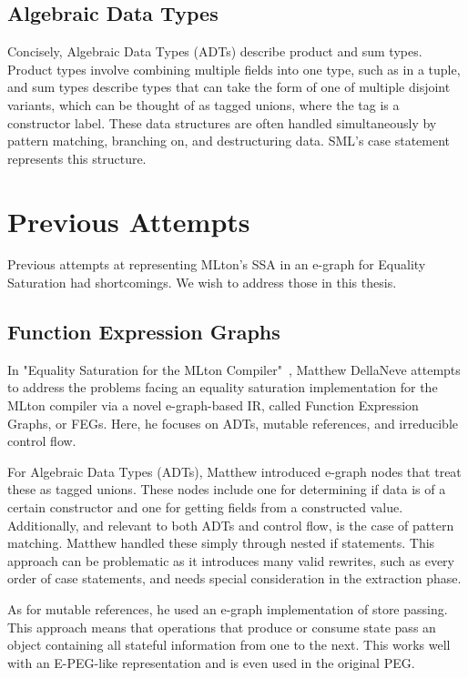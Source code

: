 \documentclass{article}
\begin{document}
\subsection{Algebraic Data Types}

Concisely, Algebraic Data Types (ADTs) describe product and sum types. Product types involve combining multiple fields into one type, such as in a tuple, and sum types describe types that can take the form of one of multiple disjoint variants, which can be thought of as tagged unions, where the tag is a constructor label. These data structures are often handled simultaneously by pattern matching, branching on, and destructuring data. SML's case statement represents this structure.



\section{Previous Attempts}

Previous attempts at representing MLton's SSA in an e-graph for Equality Saturation had shortcomings. We wish to address those in this thesis.

\subsection{Function Expression Graphs}

In "Equality Saturation for the MLton Compiler"~\cite{dellaneve_2023}, Matthew DellaNeve attempts to address the problems facing an equality saturation implementation for the MLton compiler via a novel e-graph-based IR, called Function Expression Graphs, or FEGs. Here, he focuses on ADTs, mutable references, and irreducible control flow.

For Algebraic Data Types (ADTs), Matthew introduced e-graph nodes that treat these as tagged unions. These nodes include one for determining if data is of a certain constructor and one for getting fields from a constructed value. Additionally, and relevant to both ADTs and control flow, is the case of pattern matching. Matthew handled these simply through nested if statements. This approach can be problematic as it introduces many valid rewrites, such as every order of case statements, and needs special consideration in the extraction phase.

As for mutable references, he used an e-graph implementation of store passing. This approach means that operations that produce or consume state pass an object containing all stateful information from one to the next. This works well with an E-PEG-like representation and is even used in the original PEG.
\end{document}

